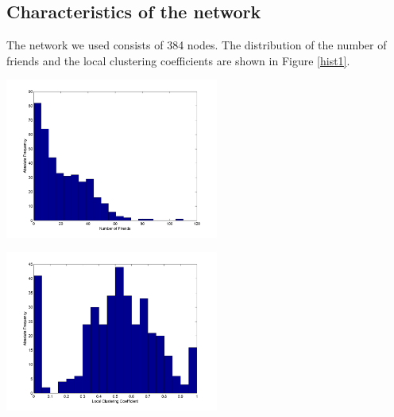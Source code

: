 

















\subsection{Characteristics of the network}

The network we used consists of 384 nodes. The distribution of the number of friends and the local clustering coefficients are shown in Figure \ref{hist1}.


\begin{minipage}{0.5\textwidth}
\includegraphics[width=7cm]{network_degreehist.png}
\end{minipage}
\begin{minipage}{0.5\textwidth}
\includegraphics[width=7cm]{network_clusterhist.png}
\end{minipage}
\label{hist1}


